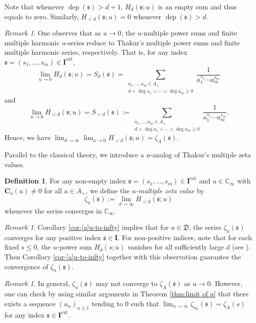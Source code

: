 \documentclass[12pt,reqno]{amsart}
\numberwithin{equation}{section}
\theoremstyle{plain}
\theoremstyle{definition}
\newtheorem{df}[thm]{Definition}
\theoremstyle{remark}
\newtheorem{rmk}[thm]{Remark}
\newcommand{\CC}{\mathbb{C}}
\newcommand{\Dfk}{\mathfrak{D}}
\newcommand{\dep}{\operatorname{dep}}
\newcommand{\ww}[1]{\mathfrak{#1}}
\newcommand{\C}{\mathbf{C}}
\newcommand{\Ical}{\mathbf{I}}
\newcommand{\ext}{\mathrm{ext}}
\begin{document}
Note that whenever $\dep(\ww{s}) > d+1$, $H_{d}(\ww{s};u)$ is an empty sum and thus equals to zero. Similarly, $H_{<d}(\ww{s};u)=0$ whenever $\dep(\ww{s}) > d$.

\begin{rmk}One observes that as $u \to 0$, the $u$-multiple power sums and finite multiple harmonic $u$-series reduce to Thakur's multiple power sums and finite multiple harmonic series, respectively. That is, for any index $\ww{s} = (s_1, \dots, s_m) \in \Ical^{\ext}$,$$\lim_{u \to 0} H_d(\ww{s}; u) = S_d(\ww{s}) = \sum_{\substack{a_1, \ldots, a_m \in A_+ \\ d = \deg a_1 > \cdots > \deg a_m \ge 0}} \frac{1}{a_1^{s_1} \cdots a_m^{s_m}}$$and
\[
    \lim_{u \to 0} H_{<d}(\ww{s}; u) = S_{<d}(\ww{s}) := \sum_{\substack{a_1, \ldots, a_m \in A_+ \\ d > \deg a_1 > \cdots > \deg a_m \ge 0}} \frac{1}{a_1^{s_1} \cdots a_m^{s_m}}.
\]
Hence, we have
$\lim_{d\to\infty}\lim_{u\to 0}H_{<d}(\ww{s};u)=\zeta_A(\ww{s}).$
\end{rmk}

Parallel to the classical theory, we introduce a $u$-analog of Thakur's multiple zeta values.
\begin{df}\label{df:uMZV}
    For any non-empty index $\ww{s}=(s_1,\ldots,s_m)\in\Ical^{\ext}$ and $u\in\CC_\infty$ with $\C_a(u)\neq 0$ for all $a\in A_+$, we define the \textit{$u$-multiple zeta value} by
    $$
    \zeta_u(\ww{s}):=\lim_{d\to\infty}H_{<d}(\ww{s};u)
    $$
    whenever the series converges in $\CC_\infty$.
\end{df}
\begin{rmk}
    Corollary \ref{cor-[a]u-to-infty} implies that for $u\in\Dfk$, the series $\zeta_u(\ww{s})$ converges for any positive index $\ww{s}\in\Ical$. For non-positive indices, note that for each fixed $s\leq 0$, the $u$-power sum $H_d(s;u)$ vanishes for all sufficiently large $d$ (see \cite[Theorem 5.1.2]{Thakur2004}). Then Corollary \ref{cor-[a]u-to-infty} together with this observation guarantee the convergence of $\zeta_u(\ww{s})$.
\end{rmk}
\begin{rmk}
    In general, $\zeta_u(\ww{s})$ may not converge to $\zeta_A(\ww{s})$ as $u\to 0$. However, one can check by using similar arguments in Theorem \ref{thm:limit of u} that there exists a sequence $(u_n)_{n\geq 1}$ tending to $0$ such that $\lim_{n\to\infty}\zeta_{u_n}(\ww{s})=\zeta_A(s)$ for any index $\ww{s}\in\Ical^{\ext}$.
\end{rmk}
\end{document}
